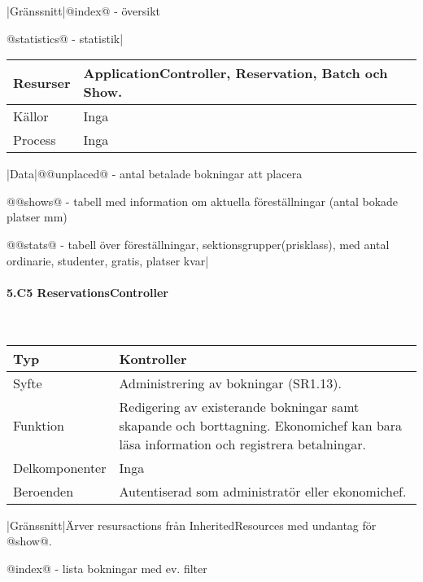\documentclass[a4paper, twoside, 11pt, titlepage]{article}
\begin{document}
			|Gränssnitt|@index@ - översikt

			@statistics@ - statistik|

			\begin {table} [ht] \begin{tabular} {  p{3.5cm} p{9.6cm} }
				\hline
				Resurser & ApplicationController, Reservation, Batch och Show.  \\
				\hline
				Källor & Inga  \\
				\hline
				Process & Inga  \\
				\hline
			\end{tabular} \end{table} \FloatBarrier
			\vspace{6mm}

			|Data|@@unplaced@ - antal betalade bokningar att placera

			@@shows@ - tabell med information om aktuella föreställningar (antal bokade platser mm)

			@@stats@ - tabell över föreställningar, sektionsgrupper(prisklass), med antal ordinarie, studenter, gratis, platser kvar|

			\paragraph{5.C5 ReservationsController}\

			\begin {table} [ht] \begin{tabular} {  p{3.5cm} p{9.6cm} }
				\hline
				Typ & Kontroller  \\
				\hline
				Syfte & Administrering av bokningar (SR1.13).  \\
				\hline
				Funktion & Redigering av existerande bokningar samt skapande och borttagning. Ekonomichef kan bara läsa information och registrera betalningar.  \\
				\hline
				Delkomponenter & Inga  \\
				\hline
				Beroenden & Autentiserad som administratör eller ekonomichef.  \\
				\hline
			\end{tabular} \end{table} \FloatBarrier
			\vspace{6mm}

			|Gränssnitt|Ärver resursactions från InheritedResources med undantag för @show@.

			@index@ - lista bokningar med ev. filter
\end{document}
